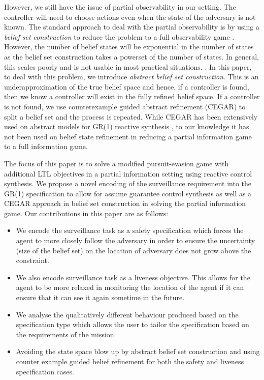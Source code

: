 However, we still have the issue of partial observability in our setting. The controller will need to choose actions even when the state of the adversary is not known. The standard approach to deal with the partial observability is by using a \emph{belief set construction} to reduce the problem to a full observability game \cite{Bertoli2006}. However, the number of belief states will be exponential in the number of states \cite{Rintanen2004} as the belief set construction takes a powerset of the number of states. In general, this scales poorly and is not usable in most practical situations. . In this paper, to deal with this problem, we introduce \emph{abstract belief set construction}. This is an underapproximation of the true belief space and hence, if a controller is found, then we know a controller will exist in the fully refined belief space. If a controller is not found, we use counterexample guided abstract refinement (CEGAR) to split a belief set and the process is repeated. While CEGAR has been extensively used on abstract models for GR(1) reactive synthesis \cite{Alur2015,keylist}, to our knowledge it has not been used on belief state refinement in reducing a partial information game to a full information game. 

The focus of this paper is to solve a modified pursuit-evasion game with additional LTL objectives in a partial information setting using reactive control synthesis. We propose a novel encoding of the surveillance requirement into the GR(1) specification to allow for assume guarantee control synthesis as well as a CEGAR approach in belief set construction in solving the partial information game. Our contributions in this paper are as follows:
\begin{itemize}
\item We encode the surveillance task as a safety specification which forces the agent to more closely follow the adversary in order to ensure the uncertainty (size of the belief set) on the location of adversary does not grow above the constraint.
\item We also encode surveillance task as a liveness objective. This allows for the agent to be more relaxed in monitoring the location of the agent if it can ensure that it can see it again sometime in the future.
\item We analyse the qualitatively different behaviour produced based on the specification type which allows the user to tailor the specification based on the requirements of the mission.
\item Avoiding the state space blow up by abstract belief set construction and using counter example guided belief refinement for both the safety and liveness specification cases.
\end{itemize}

